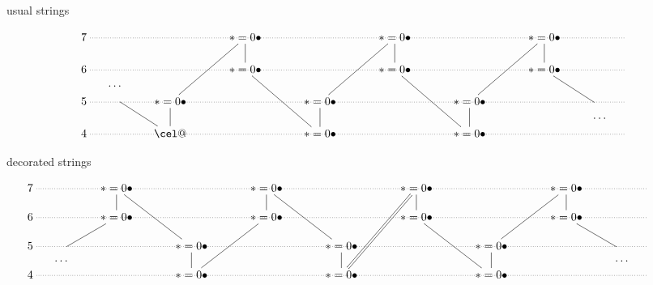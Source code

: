 \documentclass[12pt,a4paper]{amsart}
\theoremstyle{definition}
\theoremstyle{remark}
\numberwithin{equation}{section}
\begin{document}
 \begin{table}[htp]
   \caption{}\vspace*{-1.3em}
  \medskip
   \begin{center}
       \sf usual strings
   \end{center}
\medskip
 \[
 \xymatrix@R=.1ex@C=3ex@!R{
	 {7} \ar@{.} [rrrrrrrrrrrrrr] &&&& {*=0{\bullet}} \ar@{-}[dd] &&&& {*=0{\bullet}} \ar@{-}[dd]
 &&&& {*=0{\bullet}} \ar@{-}[dd] && {} \\
  {}\\
	{6} \ar@{.} [rrrrrrrrrrrrrr] &&&& {*=0{\bullet}} \ar@{-}[ddddrr] &&&& {*=0{\bullet}} \ar@{-}[ddddrr] 
 &&&& {*=0{\bullet}} \ar@{-}[ddr] && {}  \\
	& {\cdots\quad } \\
	{5} \ar@{.} [rrrrrrrrrrrrrr] & *=0{}& {*=0{\bullet}} \ar@{-}[uuuurr] \ar@{-}[dd] &&&&
 {*=0{\bullet}} \ar@{-}[uuuurr] \ar@{-}[dd] &&&&  {*=0{\bullet}} \ar@{-}[uuuurr] \ar@{-}[dd] &&& *=0{} & {} \\
	&&&&&&&&&&&&& {\quad \cdots}  \\
	{4}  \ar@{.} [rrrrrrrrrrrrrr] && \cel@\ar@{-}[uul] &&&& {*=0{\bullet}} &&&& {*=0{\bullet}} &&&& {}
 } 
 \]
 \medskip
 \begin{center}
     \sf decorated strings
 \end{center}
\medskip
 \[
 \hspace*{-1cm}
    \xymatrix@R=.1ex@C=3ex@!R{
	 {7} \ar@{.} [rrrrrrrrrrrrrrrr] && {*=0{\bullet}} \ar@{-}[dd] \ar@{-}[ddddrr] &&&&
 {*=0{\bullet}} \ar@{-}[dd] \ar@{-}[ddddrr] &&&& {*=0{\bullet}} \ar@{-}[dd] &&&& {*=0{\bullet}} \ar@{-}[dd] && {} \\
 {} \\
	{6} \ar@{.} [rrrrrrrrrrrrrrrr] && {*=0{\bullet}} \ar@{-}[ddl] &&&& {*=0{\bullet}} \ar@{-}[ddddll] 
 &&&& {*=0{\bullet}} \ar@{-}[ddddrr] &&&& {*=0{\bullet}} \ar@{-}[ddr] && {}  \\
	{} \\
	{5} \ar@{.} [rrrrrrrrrrrrrrrr] & *=0{}&&& {*=0{\bullet}} \ar@{-}[dd] &&&&
 {*=0{\bullet}} \ar@{-}[dd] &&&&  {*=0{\bullet}} \ar@{-}[uuuurr] \ar@{-}[dd] &&& *=0{} & {} \\
	& {\cdots\quad} &&&&&&&&&&&&&& {\quad \cdots}  \\
	{4}  \ar@{.} [rrrrrrrrrrrrrrrr] &&&& {*=0{\bullet}} &&&& {*=0{\bullet}}
    \ar@{=}[uuuuuurr] &&&& {*=0{\bullet}} &&&& {} 
 }  
 \] 


\end{table}
\end{document}
